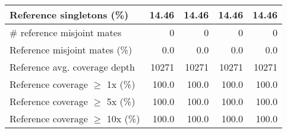 \documentclass[12pt,a4paper]{article}
\begin{document}
\begin{table}[ht]
\begin{center}
\begin{tabular}{|l*{4}{|r}|}
Reference singletons (\%) & 14.46 & 14.46 & 14.46 & 14.46 \\ \hline
\# reference misjoint mates & 0 & 0 & 0 & 0 \\ \hline
Reference misjoint mates (\%) & 0.0 & 0.0 & 0.0 & 0.0 \\ \hline
Reference avg. coverage depth & 10271 & 10271 & 10271 & 10271 \\ \hline
Reference coverage $\geq$ 1x (\%) & 100.0 & 100.0 & 100.0 & 100.0 \\ \hline
Reference coverage $\geq$ 5x (\%) & 100.0 & 100.0 & 100.0 & 100.0 \\ \hline
Reference coverage $\geq$ 10x (\%) & 100.0 & 100.0 & 100.0 & 100.0 \\ \hline
\end{tabular}
\end{center}
\end{table}
\end{document}
